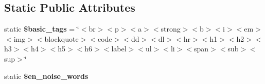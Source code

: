 \subsection*{Static Public Attributes}
\begin{DoxyCompactItemize}
\item 
\hypertarget{class_g_u_m_p_a47bde685875ba3eb99b7c6a7faa9da8d}{static {\bfseries \$basic\-\_\-tags} = \char`\"{}$<$br$>$$<$p$>$$<$a$>$$<$strong$>$$<$b$>$$<$i$>$$<$em$>$$<$img$>$$<$blockquote$>$$<$code$>$$<$dd$>$$<$dl$>$$<$hr$>$$<$h1$>$$<$h2$>$$<$h3$>$$<$h4$>$$<$h5$>$$<$h6$>$$<$label$>$$<$ul$>$$<$li$>$$<$span$>$$<$sub$>$$<$sup$>$\char`\"{}}\label{class_g_u_m_p_a47bde685875ba3eb99b7c6a7faa9da8d}

\item 
static {\bfseries \$en\-\_\-noise\-\_\-words}
\end{DoxyCompactItemize}
